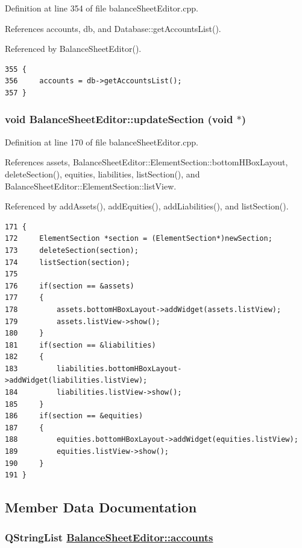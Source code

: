 Definition at line 354 of file balance\-Sheet\-Editor.cpp.

References accounts, db, and Database::get\-Accounts\-List().

Referenced by Balance\-Sheet\-Editor().

\footnotesize\begin{verbatim}355 {
356     accounts = db->getAccountsList();
357 }
\end{verbatim}\normalsize 


\hypertarget{classBalanceSheetEditor_k0}{
\subsubsection[updateSection]{\setlength{\rightskip}{0pt plus 5cm}void Balance\-Sheet\-Editor::update\-Section (void $\ast$)}}
\label{classBalanceSheetEditor_k0}


Definition at line 170 of file balance\-Sheet\-Editor.cpp.

References assets, Balance\-Sheet\-Editor::Element\-Section::bottom\-HBox\-Layout, delete\-Section(), equities, liabilities, list\-Section(), and Balance\-Sheet\-Editor::Element\-Section::list\-View.

Referenced by add\-Assets(), add\-Equities(), add\-Liabilities(), and list\-Section().

\footnotesize\begin{verbatim}171 {
172     ElementSection *section = (ElementSection*)newSection;
173     deleteSection(section);
174     listSection(section);
175     
176     if(section == &assets) 
177     {
178         assets.bottomHBoxLayout->addWidget(assets.listView);
179         assets.listView->show();
180     }
181     if(section == &liabilities) 
182     {
183         liabilities.bottomHBoxLayout->addWidget(liabilities.listView);
184         liabilities.listView->show();
185     }
186     if(section == &equities) 
187     {
188         equities.bottomHBoxLayout->addWidget(equities.listView);
189         equities.listView->show();
190     }
191 }
\end{verbatim}\normalsize 




\subsection{Member Data Documentation}
\hypertarget{classBalanceSheetEditor_r1}{
\subsubsection[accounts]{\setlength{\rightskip}{0pt plus 5cm}QString\-List \hyperlink{classBalanceSheetEditor_r1}{Balance\-Sheet\-Editor::accounts}}}
\label{classBalanceSheetEditor_r1}


